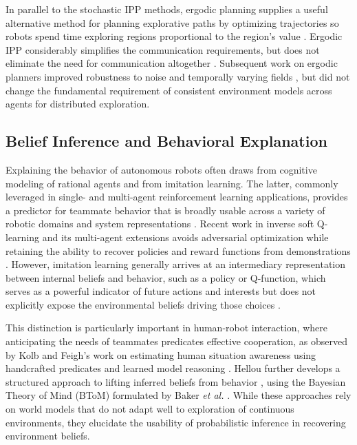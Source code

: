 \documentclass[letterpaper,10pt,conference]{ieeeconf}
\begin{document}
In parallel to the stochastic IPP methods, ergodic planning supplies a useful alternative method for planning explorative paths by optimizing trajectories so robots spend time exploring regions proportional to the region's value \cite{mathew2011ergodicity}.  Ergodic IPP considerably simplifies the communication requirements, but does not eliminate the need for communication altogether \cite{abraham2018decentralized}. Subsequent work on ergodic planners improved robustness to noise and temporally varying fields \cite{miller2016ergodic, hughes2026motionfields}, but did not change the fundamental requirement of consistent environment models across agents for distributed exploration.

\subsection{Belief Inference and Behavioral Explanation}

Explaining the behavior of autonomous robots often draws from cognitive modeling of rational agents and from imitation learning. The latter, commonly leveraged in single- and multi-agent reinforcement learning applications, provides a predictor for teammate behavior that is broadly usable across a variety of robotic domains and system representations \cite{ho2016generative}. Recent work in inverse soft Q-learning and its multi-agent extensions avoids adversarial optimization while retaining the ability to recover policies and reward functions from demonstrations \cite{garg2021iq,mai2024inverse}. However, imitation learning generally arrives at an intermediary representation between internal beliefs and behavior, such as a policy or Q-function, which serves as a powerful indicator of future actions and interests but does not explicitly expose the environmental beliefs driving those choices \cite{jarrett2021inverse}.

This distinction is particularly important in human-robot interaction, where anticipating the needs of teammates predicates effective cooperation, as observed by Kolb and Feigh's work on estimating human situation awareness using handcrafted predicates and learned model reasoning \cite{kolb2024inferring}. Hellou further develops a structured approach to lifting inferred beliefs from behavior \cite{hellou2023bayesian}, using the Bayesian Theory of Mind (BToM) formulated by Baker \emph{et al.} \cite{baker2017rational}. While these approaches rely on world models that do not adapt well to exploration of continuous environments, they elucidate the usability of probabilistic inference in recovering environment beliefs.
\end{document}
